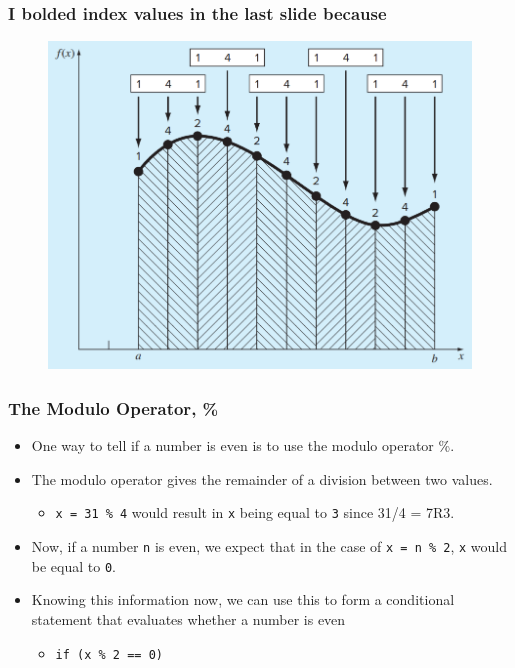 \documentclass{if-beamer}
\begin{document}
\begin{frame}
	\frametitle{I bolded \textbf{index values} in the last slide because}
	\begin{figure}
		\centering
		\includegraphics[width = .8\textwidth]{figures/compsimp}
	\end{figure}
\end{frame}

\begin{frame}
	\frametitle{The Modulo Operator, \%}
	\begin{itemize}
		\item One way to tell if a number is even is to use the modulo operator \%. \\\vspace{10pt}
		\item The modulo operator gives the remainder of a division between two values. \\\vspace{10pt}
		\begin{itemize}
			\item \texttt{x = 31 \% 4} would result in \texttt{x} being equal to \texttt{3} since 31/4 = 7R3. \\\vspace{10pt}  
		\end{itemize}
		\item Now, if a number \texttt{n} is even, we expect that in the case of \texttt{x = n \% 2}, \texttt{x} would be equal to \texttt{0}. \\\vspace{10pt}
		\item Knowing this information now, we can use this to form a conditional statement that evaluates whether a number is even \\\vspace{10pt}
		\begin{itemize}
			\item \texttt{if (x \% 2 == 0)}
		\end{itemize}
	\end{itemize}
\end{frame}
\end{document}
